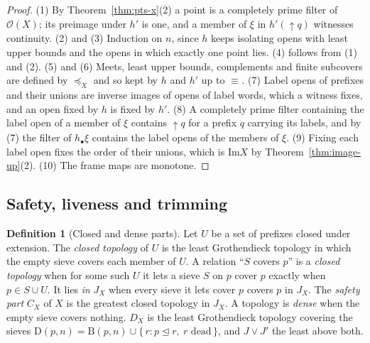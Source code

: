 \documentclass{lmcs}
\theoremstyle{definition}
\newtheorem{definition}[theorem]{Definition}
\theoremstyle{remark}
\newcommand{\Op}{\mathcal{O}}
\newcommand{\ext}{\trianglelefteq}
\newcommand{\JX}[1]{J_{#1}}
\newcommand{\BB}{\mathrm{B}}
\newcommand{\fle}[1]{\preceq_{#1}}
\newcommand{\feq}[1]{\equiv_{#1}}
\newcommand{\upc}[1]{{\uparrow}#1}
\providecommand{\Ima}{\mathrm{Im}}
\begin{document}
\begin{proof}
(1) By Theorem~\ref{thm:pts-x}(2) a point is a completely prime filter of $\Op(X)$; its preimage under $h'$ is one,
and a member of $\xi$ in $h'(\upc{q})$ witnesses
continuity.
(2) and (3) Induction on $n$, since $h$ keeps isolating
opens
with least upper bounds and the opens in which exactly one point lies. (4) follows from (1) and
(2). (5) and (6) Meets, least
upper bounds, complements and finite subcovers are defined by $\fle{X}$ and so kept by $h$ and $h'$ up to
$\feq{}$.
(7) Label opens of prefixes and their unions are inverse images of opens of label words, which a
witness fixes, and an open fixed by $h$ is fixed by
$h'$.
(8) A completely prime filter containing the label open of a member of $\xi$ contains $\upc{q}$ for a prefix $q$
carrying its labels, and by (7) the filter of $h_\bullet\xi$ contains the label opens of the members of
$\xi$. (9) Fixing each label open fixes
the order of their unions, which is $\Ima X$ by Theorem~\ref{thm:image-up}(2).
(10) The frame maps are monotone.
\end{proof}

\subsection{Safety, liveness and trimming}\label{ssec:safety}

\begin{definition}[Closed and dense parts]\label{def:setup-parts}
Let $U$ be a set of prefixes closed under extension. The \emph{closed topology} of $U$ is the least Grothendieck
topology in which the empty sieve covers each member of
$U$. A relation ``$S$ covers $p$'' is a \emph{closed
topology} when for some such $U$ it lets a sieve $S$ on $p$ cover $p$ exactly when $p\in S\cup
U$. It lies \emph{in} $\JX{X}$ when every sieve it lets cover $p$ covers $p$ in
$\JX{X}$. The \emph{safety part} $C_X$ of $X$ is the greatest closed topology in
$\JX{X}$. A topology is \emph{dense} when the empty sieve covers nothing. $D_X$ is the
least Grothendieck topology covering the sieves $\mathrm{D}(p,n)=\BB(p,n)\cup\{\,r : p\ext r,\ r\text{ dead}\,\}$,
and $J\vee J'$ the least above both.
\end{definition}
\end{document}
